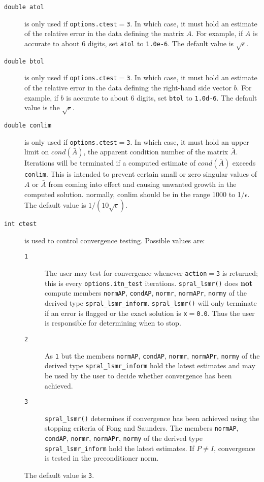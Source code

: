 \begin{description}

\item[\texttt{double atol}] is only used if
   {\tt options.ctest}$ =${\tt 3}.
   In which case, it must hold an estimate of the relative error in the data
   defining the matrix $A$.  For example, if $A$ is accurate to about 6 digits,
   set {\tt atol} to {\tt 1.0e-6}. The default value is $\sqrt{\epsilon}$.

\item[\texttt{double btol}] is only used if
   {\tt options.ctest}$ =${\tt 3}.
   In which case, it must hold an estimate of the relative error in the data
   defining the right-hand side vector $b$.  For example, if $b$ is
   accurate to about 6 digits, set {\tt btol} to {\tt 1.0d-6}. The default value
   is the $\sqrt{\epsilon}$.


\item[\texttt{double conlim}] is only used if
   {\tt options.ctest}$ =${\tt 3}.
   In which case, it must hold an upper limit on $cond(\bar{A})$, the apparent
   condition number of the matrix $\bar{A}$. Iterations will be terminated 
   if a computed estimate of $cond(\bar{A})$ exceeds {\tt conlim}.
   This is intended to prevent certain small or
   zero singular values of $A$ or $\bar{A}$ from
   coming into effect and causing unwanted growth in the computed solution.
   normally, conlim should be in the range 1000 to 1/$\epsilon$.
   The default value is $1/(10\sqrt{\epsilon})$.

\item[\texttt{int ctest}] is used to control
   convergence testing. Possible values are:
   \begin{description}
   \item[\texttt{1}] The user may test for convergence whenever 
      {\tt action}$ = ${\tt 3} is returned; this is
      every {\tt options.itn\_test} iterations.
      {\tt spral\_lsmr()} does {\bf not} compute members
      {\tt normAP}, {\tt condAP}, {\tt normr}, {\tt normAPr}, {\tt normy}
      of the derived type {\tt spral\_lsmr\_inform}.
      {\tt spral\_lsmr()} will only terminate if an  error is flagged
      or the exact solution is {\tt x}$ = ${\tt 0.0}.
      Thus the user is responsible for determining when to stop.
   \item[\texttt{2}] As {\texttt 1} but the members
      {\tt normAP}, {\tt condAP}, {\tt normr}, {\tt normAPr}, {\tt normy}
      of the derived type {\tt spral\_lsmr\_inform} hold the latest estimates and
      may be used by the user to decide whether convergence has been achieved.
   \item[\texttt{3}] {\tt spral\_lsmr()} determines if convergence has been achieved
      using the stopping criteria of Fong and Saunders. The members
      {\tt normAP}, {\tt condAP}, {\tt normr}, {\tt normAPr}, {\tt normy}
      of the derived type {\tt spral\_lsmr\_inform} hold the latest estimates.
      If $P \neq I$,  convergence is tested in the
      preconditioner norm.
   \end{description}
   The default value is {\tt 3}.


\end{description}
